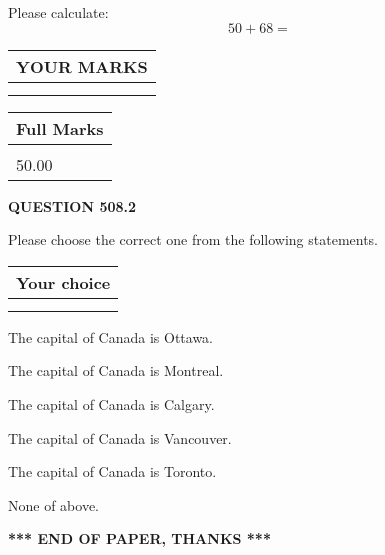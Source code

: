 \documentclass[12pt]{article}
\begin{document}
  
 
Please calculate:
\begin{equation}
50 +  %
68 = \nonumber
\end{equation}
 

 

 
  
\vspace{0.2in}
  
\noindent\begin{tabular}{|l|}
\hline
 YOUR MARKS  \\
\hline
 \\ 
 \\ 
\hline
\end{tabular}
\hspace{0.05in} \begin{tabular}{|l|}
\hline
 Full Marks  \\
\hline
 \\ 
50.00 \\
\hline
\end{tabular}
{\textbf{\Large{QUESTION
508.2 
}}}
  
  
Please choose the correct one from the following statements.
  
  
\noindent\hspace{3.0in} \begin{tabular}{|l|}
\hline
Your choice \\
\hline
 \\ 
 \\ 
\hline
\end{tabular}
  
  
 
 
The capital of Canada is Ottawa.
 
 
The capital of Canada is Montreal.
 
 
The capital of Canada is Calgary.
 
 
The capital of Canada is Vancouver.
 
 
The capital of Canada is Toronto.
 
 
 None of above.
 
 
   
   
 \vspace{0.2in}
 
   
   
   
   
\vspace{1.0in} 
{\textbf{\large{ *** END OF PAPER, THANKS *** }}} 
   
\end{document}
